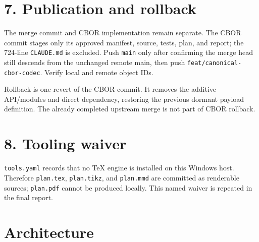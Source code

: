 \documentclass[11pt,a4paper]{article}
\begin{document}
\section*{7. Publication and rollback}

The merge commit and CBOR implementation remain separate. The CBOR commit stages only its approved
manifest, source, tests, plan, and report; the 724-line \texttt{CLAUDE.md} is excluded. Push
\texttt{main} only after confirming the merge head still descends from the unchanged remote main,
then push \texttt{feat/canonical-cbor-codec}. Verify local and remote object IDs.

Rollback is one revert of the CBOR commit. It removes the additive API/modules and direct dependency,
restoring the previous dormant payload definition. The already completed upstream merge is not part
of CBOR rollback.

\section*{8. Tooling waiver}

\texttt{tools.yaml} records that no TeX engine is installed on this Windows host. Therefore
\texttt{plan.tex}, \texttt{plan.tikz}, and \texttt{plan.mmd} are committed as renderable sources;
\texttt{plan.pdf} cannot be produced locally. This named waiver is repeated in the final report.

\section*{Architecture}


\end{document}
